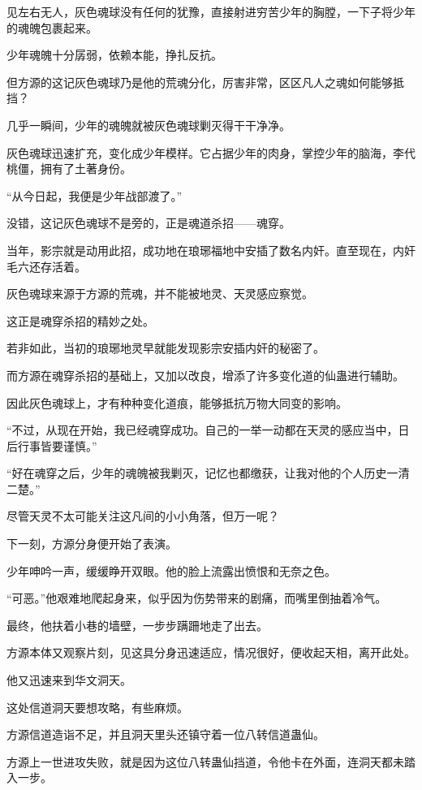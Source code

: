 \begin{this_body}
见左右无人，灰色魂球没有任何的犹豫，直接射进穷苦少年的胸膛，一下子将少年的魂魄包裹起来。

少年魂魄十分孱弱，依赖本能，挣扎反抗。

但方源的这记灰色魂球乃是他的荒魂分化，厉害非常，区区凡人之魂如何能够抵挡？

几乎一瞬间，少年的魂魄就被灰色魂球剿灭得干干净净。

灰色魂球迅速扩充，变化成少年模样。它占据少年的肉身，掌控少年的脑海，李代桃僵，拥有了土著身份。

“从今日起，我便是少年战部渡了。”

没错，这记灰色魂球不是旁的，正是魂道杀招——魂穿。

当年，影宗就是动用此招，成功地在琅琊福地中安插了数名内奸。直至现在，内奸毛六还存活着。

灰色魂球来源于方源的荒魂，并不能被地灵、天灵感应察觉。

这正是魂穿杀招的精妙之处。

若非如此，当初的琅琊地灵早就能发现影宗安插内奸的秘密了。

而方源在魂穿杀招的基础上，又加以改良，增添了许多变化道的仙蛊进行辅助。

因此灰色魂球上，才有种种变化道痕，能够抵抗万物大同变的影响。

“不过，从现在开始，我已经魂穿成功。自己的一举一动都在天灵的感应当中，日后行事皆要谨慎。”

“好在魂穿之后，少年的魂魄被我剿灭，记忆也都缴获，让我对他的个人历史一清二楚。”

尽管天灵不太可能关注这凡间的小小角落，但万一呢？

下一刻，方源分身便开始了表演。

少年呻吟一声，缓缓睁开双眼。他的脸上流露出愤恨和无奈之色。

“可恶。”他艰难地爬起身来，似乎因为伤势带来的剧痛，而嘴里倒抽着冷气。

最终，他扶着小巷的墙壁，一步步蹒跚地走了出去。

方源本体又观察片刻，见这具分身迅速适应，情况很好，便收起天相，离开此处。

他又迅速来到华文洞天。

这处信道洞天要想攻略，有些麻烦。

方源信道造诣不足，并且洞天里头还镇守着一位八转信道蛊仙。

方源上一世进攻失败，就是因为这位八转蛊仙挡道，令他卡在外面，连洞天都未踏入一步。


\end{this_body}
